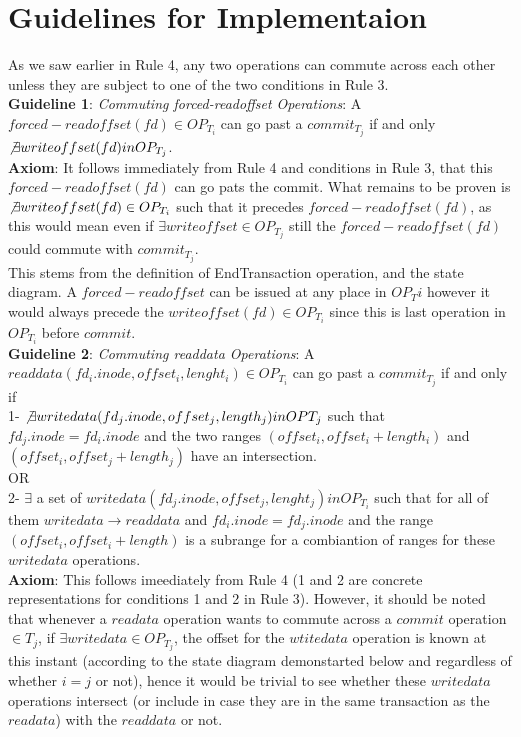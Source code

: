 \documentclass[a4paper, 11pt]{article}
\begin{document}
\section{Guidelines for Implementaion}

As we saw earlier in Rule 4, any two operations can commute across each other unless they are subject to one of the two conditions in Rule 3.\\  

\textbf{Guideline 1}: \emph{Commuting forced-readoffset Operations}: A $forced-readoffset(fd) \in OP_{T_i}$ can go past a $commit_{T_j}$ if and only $\not \exists writeoffset(fd) in OP_{T_j}$.\\

\textbf{Axiom}: It follows immediately from Rule 4 and conditions in Rule 3, that this $forced-readoffset(fd)$ can go pats the commit. What remains to be proven is  $ \not \exists writeoffset(fd) \in OP_{T_i}$ such that it precedes 
$forced-readoffset(fd)$, as this would mean even if $\exists writeoffset \in OP_{T_j}$ still the $forced-readoffset(fd)$ could commute with $commit_{T_j}$.\\

This stems from the definition of EndTransaction operation, and the state diagram. A $forced-readoffset$ can be issued at any place in $OP_T{i}$ however it would always precede the $writeoffset(fd) \in OP_{T_i}$ since this is last operation in $OP_{T_i}$ before $commit$.\\

\textbf{Guideline 2}: \emph{Commuting readdata Operations}: A $readdata(fd_i.inode,offset_i, lenght_i) \in OP_{T_i}$ can go past a $commit_{T_j}$ if and only if \\

1- $\not \exists writedata(fd_j.inode, offset_j, length_j) in OP{T_j}$ such that $fd_j.inode= fd_i.inode$ and the two ranges $(offset_i, offset_i + length_i)$ and $(offset_i, offset_j + length_j)$ have an intersection.\\

 OR\\

2- $\exists$ a set of $writedata(fd_j.inode,offset_j, lenght_j) in OP_{T_i}$ such that for all of them $writedata \rightarrow readdata$ and $fd_i.inode = fd_j.inode$ and the range $(offset_i, offset_i + length)$ is a subrange for a combiantion of ranges for these $writedata$ operations.\\

\textbf{Axiom}: This follows imeediately from Rule 4 (1 and 2 are concrete representations for conditions 1 and 2 in Rule 3). However, it should be noted that whenever a $readata$ operation wants to commute across a $commit$ operation $\in T_j$, if $ \exists writedata \in OP_{T_j}$, the offset for the $wtitedata$ operation is known at this instant (according to the state diagram demonstarted below and regardless of whether $i = j$ or not), hence it would be trivial to see whether these $writedata$ operations intersect (or include in case they are in the same transaction as the $readata$) with the $readdata$ or not.\\
\end{document}
